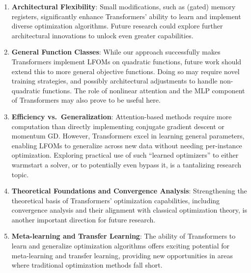 \documentclass[11pt]{article}
\numberwithin{equation}{section}
\begin{document}
\begin{enumerate}[label=(\roman*),leftmargin=*]
\setlength{\itemsep}{0pt}
\item \textbf{Architectural Flexibility}: Small modifications, such as (gated) memory registers, significantly enhance Transformers' ability to learn and implement diverse optimization algorithms. Future research could explore further architectural innovations to unlock even greater capabilities.
    
\item \textbf{General Function Classes}: While our approach successfully makes Transformers implement LFOMs on quadratic functions, future work should extend this to more general objective functions. Doing so may require novel training strategies, and possibly architectural adjustments to handle non-quadratic functions. The role of nonlinear attention and the MLP component of Transformers may also prove to be useful here.
    
\item \textbf{Efficiency vs.~Generalization}: Attention-based methods require more computation than directly implementing conjugate gradient descent or momentum GD. However, Transformers excel in learning general parameters, enabling LFOMs to generalize across new data without needing per-instance optimization. Exploring practical use of such ``learned optimizers'' to either warmstart a solver, or to potentially even bypass it, is a tantalizing research topic.
    
    
\item \textbf{Theoretical Foundations and Convergence Analysis}: Strengthening the theoretical basis of Transformers’ optimization capabilities, including convergence analysis and their alignment with classical optimization theory, is another important direction for future research.
    
\item \textbf{Meta-learning and Transfer Learning}: The ability of Transformers to learn and generalize optimization algorithms offers exciting potential for meta-learning and transfer learning, providing new opportunities in areas where traditional optimization methods fall short.
\end{enumerate}
\end{document}
